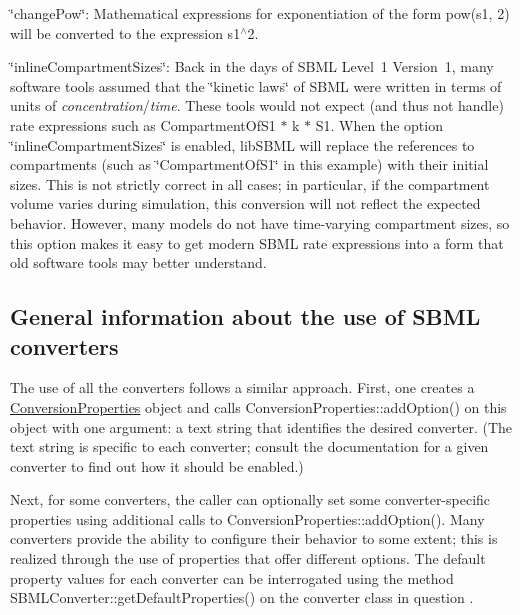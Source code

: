 \begin{DoxyItemize}
\item {\ttfamily \char`\"{}change\+Pow\char`\"{}}\+: Mathematical expressions for exponentiation of the form {\ttfamily pow(s1, 2)} will be converted to the expression {\ttfamily s1$^\wedge$2}.\end{DoxyItemize}
\begin{DoxyItemize}
\item {\ttfamily \char`\"{}inline\+Compartment\+Sizes\char`\"{}}\+: Back in the days of S\+B\+ML Level~1 Version~1, many software tools assumed that the \char`\"{}kinetic laws\char`\"{} of S\+B\+ML were written in terms of units of {\itshape concentration}/{\itshape time}. These tools would not expect (and thus not handle) rate expressions such as {\ttfamily Compartment\+Of\+S1 $\ast$ k $\ast$ S1}. When the option {\ttfamily \char`\"{}inline\+Compartment\+Sizes\char`\"{}} is enabled, lib\+S\+B\+ML will replace the references to compartments (such as {\ttfamily \char`\"{}\+Compartment\+Of\+S1\char`\"{}} in this example) with their initial sizes. This is not strictly correct in all cases; in particular, if the compartment volume varies during simulation, this conversion will not reflect the expected behavior. However, many models do not have time-\/varying compartment sizes, so this option makes it easy to get modern S\+B\+ML rate expressions into a form that old software tools may better understand.\end{DoxyItemize}
\hypertarget{classdoc__section__using__sbml__converters_using-converters}{}\subsection{General information about the use of S\+B\+M\+L converters}\label{classdoc__section__using__sbml__converters_using-converters}
The use of all the converters follows a similar approach. First, one creates a \hyperlink{class_conversion_properties}{Conversion\+Properties} object and calls Conversion\+Properties\+::add\+Option() on this object with one argument\+: a text string that identifies the desired converter. (The text string is specific to each converter; consult the documentation for a given converter to find out how it should be enabled.)

Next, for some converters, the caller can optionally set some converter-\/specific properties using additional calls to Conversion\+Properties\+::add\+Option(). Many converters provide the ability to configure their behavior to some extent; this is realized through the use of properties that offer different options. The default property values for each converter can be interrogated using the method S\+B\+M\+L\+Converter\+::get\+Default\+Properties() on the converter class in question .

